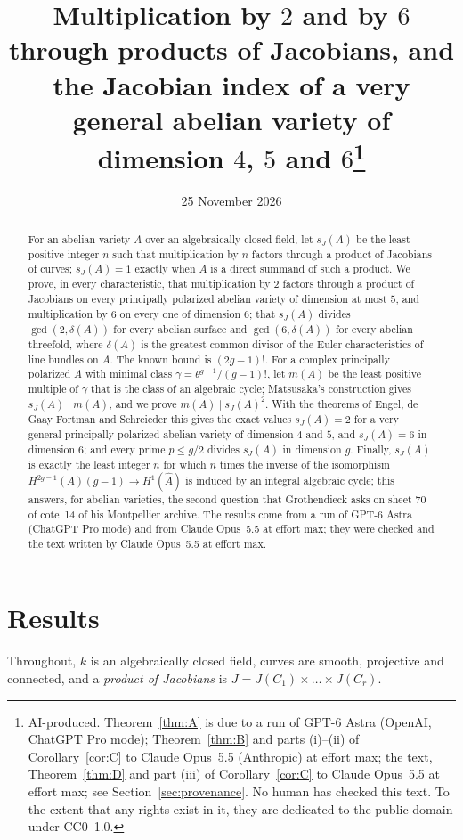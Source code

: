 \documentclass[11pt,a4paper]{article}
\title{Multiplication by $2$ and by $6$ through products of Jacobians,
and the Jacobian index of a very general abelian variety of dimension
$4$, $5$ and $6$\thanks{AI-produced. Theorem~\ref{thm:A} is due to a run of
GPT-6 Astra (OpenAI, ChatGPT Pro mode); Theorem~\ref{thm:B} and parts (i)--(ii)
of Corollary~\ref{cor:C} to Claude Opus~5.5 (Anthropic) at effort max; the
text, Theorem~\ref{thm:D} and part (iii) of Corollary~\ref{cor:C} to Claude
Opus~5.5 at effort max; see Section~\ref{sec:provenance}. No human has
checked this text. To the extent that any rights exist in it, they are
dedicated to the public domain under CC0~1.0.}}
\author{}
\date{25 November 2026}
\theoremstyle{definition}
\newcommand{\sJ}{s_J}
\begin{document}
\maketitle

\begin{abstract}
For an abelian variety $A$ over an algebraically closed field, let
$\sJ(A)$ be the least positive integer $n$ such that multiplication by $n$
factors through a product of Jacobians of curves; $\sJ(A)=1$ exactly when
$A$ is a direct summand of such a product. We prove, in every
characteristic, that multiplication by $2$ factors through a product of
Jacobians on every principally polarized abelian variety of dimension at
most $5$, and multiplication by $6$ on every one of dimension $6$; that
$\sJ(A)$ divides $\gcd(2,\delta(A))$ for every abelian surface and
$\gcd(6,\delta(A))$ for every abelian threefold, where $\delta(A)$ is the
greatest common divisor of the Euler characteristics of line bundles on
$A$. The known bound is $(2g-1)!$. For a complex principally polarized $A$
with minimal class $\gamma=\theta^{g-1}/(g-1)!$, let $m(A)$ be the least
positive multiple of $\gamma$ that is the class of an algebraic cycle;
Matsusaka's construction gives $\sJ(A)\mid m(A)$, and we prove
$m(A)\mid\sJ(A)^2$. With the theorems of
Engel, de Gaay Fortman and Schreieder this gives the exact values
$\sJ(A)=2$ for a very general principally polarized abelian variety of
dimension $4$ and $5$, and $\sJ(A)=6$ in dimension $6$; and every prime
$p\le g/2$ divides $\sJ(A)$ in dimension $g$. Finally, $\sJ(A)$ is exactly
the least integer $n$ for which $n$ times the inverse of the isomorphism
$H^{2g-1}(A)(g-1)\to H^1(\widehat A)$ is induced by an integral algebraic
cycle; this answers, for abelian varieties, the second question that
Grothendieck asks on sheet 70 of cote~14 of his Montpellier archive. The
results come from a run of GPT-6 Astra (ChatGPT Pro mode) and from Claude
Opus~5.5 at effort max; they were checked and the text written by Claude
Opus~5.5 at effort max.
\end{abstract}

\section{Results}\label{sec:results}

Throughout, $k$ is an algebraically closed field, curves are smooth,
projective and connected, and a \emph{product of Jacobians} is
$J=J(C_1)\times\dots\times J(C_r)$.
\end{document}
